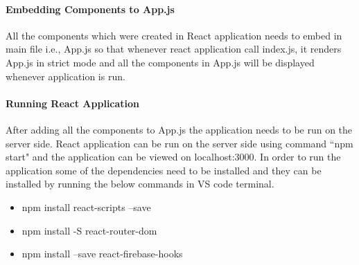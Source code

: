 \paragraph{\textbf{Embedding Components to App.js}} All the components which were created in React application needs to embed in main file i.e., App.js so that whenever react application call index.js, it  renders App.js in strict mode and all the components in App.js will be displayed whenever application is run. 

\paragraph{\textbf{Running React Application}} After adding all the components to App.js the application needs to be run on the server side. React application can be run on the server side using command ``npm start" and the application can be viewed on localhost:3000. In order to run the application some of the dependencies need to be installed and they can be installed by running the below commands in VS code terminal.
\begin{itemize}
	\item 	npm install react-scripts –save
	\item 	npm install -S react-router-dom
	\item 	npm install --save react-firebase-hooks
\end{itemize}




